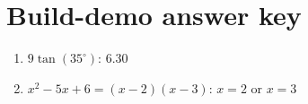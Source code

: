 \documentclass[12pt]{article}
\begin{document}
\section*{Build-demo answer key}

\begin{enumerate}
  \item $9\tan(35^\circ)$: \quad $\boxed{6.30}$
  \item $x^2 - 5x + 6 = (x-2)(x-3)$: \quad $\boxed{x = 2 \text{ or } x = 3}$
\end{enumerate}
\end{document}
